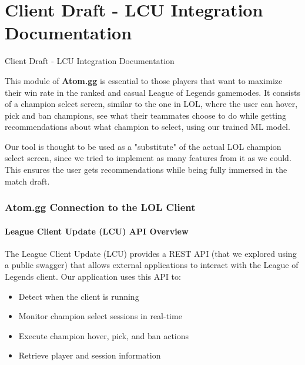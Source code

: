 \documentclass[12pt, a4paper]{article}
\renewcommand{\headrulewidth}{0.4pt}
\begin{document}
    \part{Client Draft - LCU Integration Documentation}
    \pagestyle{fancy}
    \fancyhf{} %
    \renewcommand{\headrulewidth}{0.4pt}
    \thispagestyle{empty}
    \vspace*{1cm}
    \begin{center}
        \LARGE
        Client Draft - LCU Integration Documentation

        \vfill

        \begin{minipage}{0.8\textwidth}
            \normalsize
            \noindent This module of \textbf{Atom.gg} is essential to those players that want to maximize their win rate in the ranked and casual League of Legends gamemodes. It consists of a champion select screen, similar to the one in LOL, where the user can hover, pick and ban champions, see what their teammates choose to do while getting recommendations about what champion to select, using our trained ML model.

            Our tool is thought to be used as a "substitute" of the actual LOL champion select screen, since we tried to implement as many features from it as we could. This ensures the user gets recommendations while being fully immersed in the match draft.
        \end{minipage}

        \vspace{2cm}
    \end{center}
    \newpage

    \section{Atom.gg Connection to the LOL Client}

    \subsection{League Client Update (LCU) API Overview}

    The League Client Update (LCU) provides a REST API (that we explored using a public swagger) that allows external applications to interact with the League of Legends client. Our application uses this API to:

    \begin{itemize}
        \item Detect when the client is running
        \item Monitor champion select sessions in real-time
        \item Execute champion hover, pick, and ban actions
        \item Retrieve player and session information
    \end{itemize}
\end{document}

